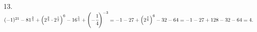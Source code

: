 13. $(-1)^{21}-81^\frac{3}{4}+\left(2^\frac{2}{3}\cdot2^\frac{1}{2}\right)^6-16^{\frac{5}{4}}+\left(-\cfrac{1}{4}\right)^{-3}=
-1-27+\left(2^\frac{7}{6}\right)^6-32-64=-1-27+128-32-64=4.$\\
